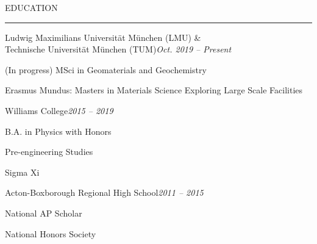 \documentclass{resume} %
\renewenvironment{rSection}[1]{
	\sectionskip
	\textcolor{RoyalPurple}{\MakeUppercase{#1}}
	\sectionlineskip
	\hrule
	\begin{list}{}{
			\setlength{\leftmargin}{1.5em}
		}
		\item[]
	}{
	\end{list}
}
\begin{document}


\vspace{-2em}
	\begin{rSection}{Education} 
		\begin{rSubsection}{Ludwig Maximilians Universit{\"a}t  M{\"u}nchen (LMU) \&\\Technische Universit{\"a}t M{\"u}nchen (TUM)}{\em Oct. 2019 -- Present}{}{}
			\vspace{-.5em}
			\item (In progress) MSci in Geomaterials and Geochemistry
			\item Erasmus Mundus: Masters in Materials Science Exploring Large Scale Facilities
		\end{rSubsection}

%
%
		\begin{rSubsection}{Williams College}{\em 2015 -- 2019}{}{}
			\vspace{-.5em}
			\item B.A. in Physics with Honors
			\item Pre-engineering Studies
			\item Sigma Xi
		\end{rSubsection}

		\begin{rSubsection}{Acton-Boxborough Regional High School}{\em 2011 -- 2015}{}{}
			\vspace{-.5em}
			\item National AP Scholar
			\item National Honors Society
		\end{rSubsection}



	\end{rSection}
\end{document}
